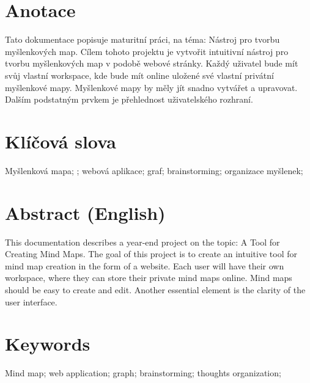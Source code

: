 

\section *{Anotace}

\clearpageenabledfalse %

Tato dokumentace popisuje maturitní práci, na téma: Nástroj pro tvorbu myšlenkových map.
Cílem tohoto projektu je vytvořit intuitivní nástroj pro tvorbu myšlenkových map v podobě webové stránky. Každý uživatel bude mít svůj vlastní workspace, kde bude mít online uložené své vlastní privátní myšlenkové mapy. Myšlenkové mapy by měly jít snadno vytvářet a upravovat. Dalším podstatným prvkem je přehlednost uživatelského rozhraní. 
\section *{Klíčová slova}
Myšlenková mapa; ; webová aplikace; graf; brainstorming; organizace myšlenek;

\vspace{40pt}
\section*{Abstract (English)}
This documentation describes a year-end project on the topic: A Tool for Creating Mind Maps.
The goal of this project is to create an intuitive tool for mind map creation in the form of a website. Each user will have their own workspace, where they can store their private mind maps online. Mind maps should be easy to create and edit. Another essential element is the clarity of the user interface.

\section *{Keywords}
Mind map; web application; graph; brainstorming; thoughts organization;


\clearpageenabledtrue